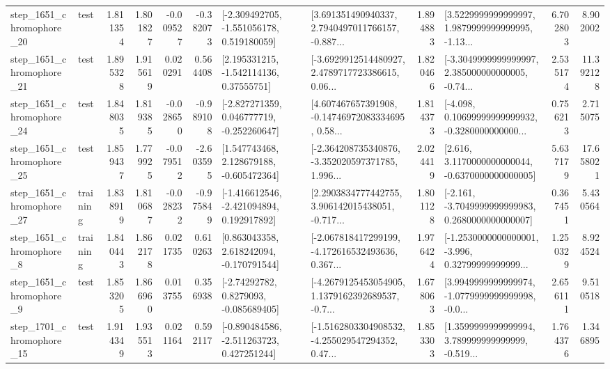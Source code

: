 \begin{tabular}{llrrrrllrlrr}
 step\_1651\_chromophore\_20 &      test &      1.811354 &    1.801827 &     -0.009527 & -0.382073 &   [-2.309492705, -1.551056178, 0.519180059] &  [3.691351490940337, 2.7940497011766157, -0.887... &       1.894883 &  [3.5229999999999997, 1.9879999999999995, -1.13... &            6.702803 &          8.902002 \\
 step\_1651\_chromophore\_21 &      test &      1.895328 &    1.915619 &      0.020291 &  0.564408 &     [2.195331215, -1.542114136, 0.37555751] &  [-3.6929912514480927, 2.4789717723386615, 0.06... &       1.820466 &  [-3.3049999999999997, 2.385000000000005, -0.74... &            2.535174 &         11.392128 \\
 step\_1651\_chromophore\_24 &      test &      1.848035 &    1.819385 &     -0.028650 & -0.989108 &   [-2.827271359, 0.046777719, -0.252260647] &  [4.607467657391908, -0.14746972083334695, 0.58... &       1.814373 &  [-4.098, 0.10699999999999932, -0.3280000000000... &            0.756213 &          2.715075 \\
 step\_1651\_chromophore\_25 &      test &      1.859437 &    1.779925 &     -0.079512 & -2.603595 &    [1.547743468, 2.128679188, -0.605472364] &  [-2.364208735340876, -3.352020597371785, 1.996... &       2.024419 &   [2.616, 3.1170000000000044, -0.6370000000000005] &            5.637179 &         17.658021 \\
 step\_1651\_chromophore\_27 &  training &      1.838919 &    1.810687 &     -0.028232 & -0.975849 &   [-1.416612546, -2.421094894, 0.192917892] &  [2.2903834777442755, 3.906142015438051, -0.717... &       1.801128 &  [-2.161, -3.7049999999999983, 0.2680000000000007] &            0.367451 &          5.430564 \\
  step\_1651\_chromophore\_8 &  training &      1.840443 &    1.862178 &      0.021735 &  0.610263 &    [0.863043358, 2.618242094, -0.170791544] &  [-2.067818417299199, -4.172616532493636, 0.367... &       1.976424 &  [-1.2530000000000001, -3.996, 0.32799999999999... &            1.250329 &          8.924524 \\
  step\_1651\_chromophore\_9 &      test &      1.853205 &    1.866960 &      0.013755 &  0.356938 &      [-2.74292782, 0.8279093, -0.085689405] &  [-4.2679125453054905, 1.1379162392689537, -0.7... &       1.678063 &  [3.9949999999999974, -1.0779999999999998, -0.0... &            2.656111 &          9.510518 \\
 step\_1701\_chromophore\_15 &      test &      1.914349 &    1.935513 &      0.021164 &  0.592117 &   [-0.890484586, -2.511263723, 0.427251244] &  [-1.5162803304908532, -4.255029547294352, 0.47... &       1.853303 &  [1.3599999999999994, 3.789999999999999, -0.519... &            1.764376 &          1.346895 \\

\end{tabular}
